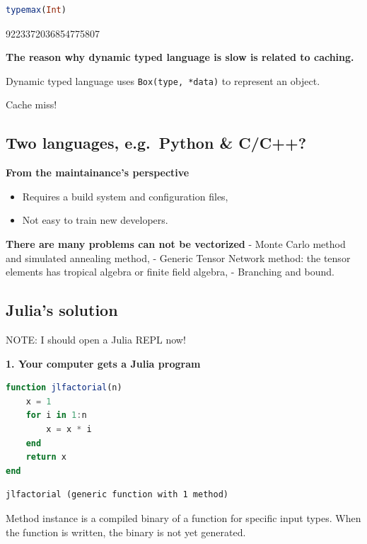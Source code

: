 \documentclass[
  notoc %
]{tufte-book}
\providecommand{\tightlist}{%
  \setlength{\itemsep}{0pt}\setlength{\parskip}{0pt}
}
\newcommand{\passthrough}[1]{#1}
\begin{document}
\begin{lstlisting}[language=Julia]
typemax(Int)
\end{lstlisting}

9223372036854775807

\textbf{The reason why dynamic typed language is slow is related to
caching.}

Dynamic typed language uses \passthrough{\lstinline!Box(type, *data)!}
to represent an object.

Cache miss!

\hypertarget{two-languages-e.g.-python-cc}{%
\subsection{Two languages, e.g.~Python \&
C/C++?}\label{two-languages-e.g.-python-cc}}

\textbf{From the maintainance's perspective}

\begin{itemize}
\tightlist
\item
  Requires a build system and configuration files,
\item
  Not easy to train new developers.
\end{itemize}

\textbf{There are many problems can not be vectorized} - Monte Carlo
method and simulated annealing method, - Generic Tensor Network method:
the tensor elements has tropical algebra or finite field algebra, -
Branching and bound.

\hypertarget{julias-solution}{%
\subsection{Julia's solution}\label{julias-solution}}

NOTE: I should open a Julia REPL now!

\textbf{1. Your computer gets a Julia program}

\begin{lstlisting}[language=Julia]
function jlfactorial(n)
    x = 1
    for i in 1:n
        x = x * i
    end
    return x
end
\end{lstlisting}

\begin{lstlisting}[language=Output]
jlfactorial (generic function with 1 method)
\end{lstlisting}

Method instance is a compiled binary of a function for specific input
types. When the function is written, the binary is not yet generated.
\end{document}
